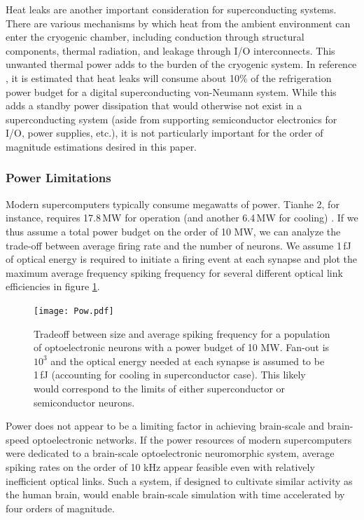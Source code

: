 \documentclass[twocolumn]{article}
\begin{document}
Heat leaks are another important consideration for superconducting systems. There are various mechanisms by which heat from the ambient environment can enter the cryogenic chamber, including conduction through structural components, thermal radiation, and leakage through I/O interconnects. This unwanted thermal power adds to the burden of the cryogenic system. In reference \cite{holmes2013energy}, it is estimated that heat leaks will consume about 10\% of the refrigeration power budget for a digital superconducting von-Neumann system. While this adds a standby power dissipation that would otherwise not exist in a superconducting system (aside from supporting semiconductor electronics for I/O, power supplies, etc.), it is not particularly important for the order of magnitude estimations desired in this paper.

\subsubsection{Power Limitations}
Modern supercomputers typically consume megawatts of power. Tianhe 2, for instance, requires 17.8\,MW for operation (and another 6.4\,MW for cooling) \cite{tolpygo2016superconductor}. If we thus assume a total power budget on the order of 10 MW, we can analyze the trade-off between average firing rate and the number of neurons. We assume 1\,fJ of optical energy is required to initiate a firing event at each synapse and plot the maximum average frequency spiking frequency for several different optical link efficiencies in figure \ref{fig:freq_size}.
\begin{figure}[H]
    \centering
    \texttt{[image: Pow.pdf]}
    \caption{Tradeoff between size and average spiking frequency for a population of optoelectronic neurons with a power budget of 10 MW. Fan-out is $10^3$ and the optical energy needed at each synapse is assumed to be 1\,fJ (accounting for cooling in superconductor case). This likely would correspond to the limits of either superconductor or semiconductor neurons.}
    \label{fig:freq_size}
\end{figure}

Power does not appear to be a limiting factor in achieving brain-scale and brain-speed optoelectronic networks. If the power resources of modern supercomputers were dedicated to a brain-scale optoelectronic neuromorphic system, average spiking rates on the order of 10 kHz appear feasible even with relatively inefficient optical links. Such a system, if designed to cultivate similar activity as the human brain, would enable brain-scale simulation with time accelerated by four orders of magnitude.
\end{document}
